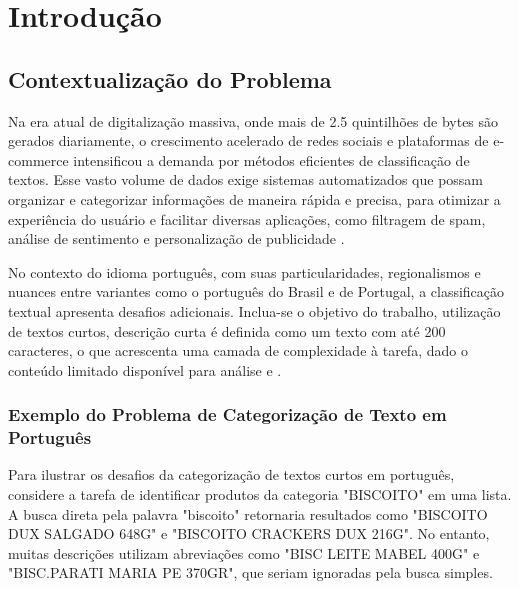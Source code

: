 \chapter{Introdução}

\section{Contextualização do Problema}



Na era atual de digitalização massiva, onde mais de 2.5 quintilhões de bytes \cite{gandomi2015137} são gerados diariamente, o crescimento acelerado de redes sociais e plataformas de e-commerce intensificou a demanda por métodos eficientes de classificação de textos. Esse vasto volume de dados exige sistemas automatizados que possam organizar e categorizar informações de maneira rápida e precisa, para otimizar a experiência do usuário e facilitar diversas aplicações, como filtragem de spam, análise de sentimento e personalização de publicidade \cite{alsmadi2019review}.


No contexto do idioma português, com suas particularidades, regionalismos e nuances entre variantes como o português do Brasil e de Portugal, a classificação textual apresenta desafios adicionais\cite{branco2012lingua}. Inclua-se o objetivo do trabalho, utilização de textos curtos, descrição curta é definida como um texto com até 200 caracteres, o que acrescenta uma camada de complexidade à tarefa, dado o conteúdo limitado disponível para análise \cite{alsmadi2019review} e \cite{song2014short}.

\subsection*{Exemplo do Problema de Categorização de Texto em Português}

Para ilustrar os desafios da categorização de textos curtos em português, considere a tarefa de identificar produtos da categoria "BISCOITO" em uma lista. A busca direta pela palavra "biscoito" retornaria resultados como "BISCOITO DUX SALGADO 648G" e "BISCOITO CRACKERS DUX 216G". No entanto, muitas descrições utilizam abreviações como "BISC LEITE MABEL 400G" e "BISC.PARATI MARIA PE 370GR", que seriam ignoradas pela busca simples.

